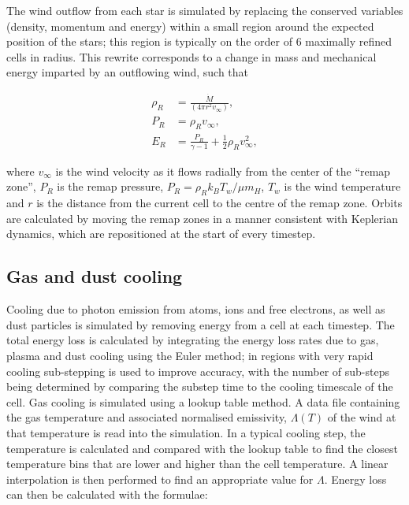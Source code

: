 The wind outflow from each star is simulated by replacing the conserved variables (density, momentum and energy) within a small region around the expected position of the stars; this region is typically on the order of 6 maximally refined cells in radius.
This rewrite corresponds to a change in mass and mechanical energy imparted by an outflowing wind, such that

\begin{subequations}
  \begin{align}
    \rho_R & = \frac{\dot M}{(4 \pi r^2 v_\infty)} , \\
    P_{R}  & = \rho_R v_\infty , \\
    E_R    & = \frac{P_R}{\gamma - 1} + \frac{1}{2} \rho_{R} v_\infty^2 ,
  \end{align}
\end{subequations}

\noindent
where $v_\infty$ is the wind velocity as it flows radially from the center of the ``remap zone'', $P_R$ is the remap pressure, $P_R = \rho_R k_B T_w / \mu m_H$, $T_w$ is the wind temperature and $r$ is the distance from the current cell to the centre of the remap zone.
Orbits are calculated by moving the remap zones in a manner consistent with Keplerian dynamics, which are repositioned at the start of every timestep.


\subsection{Gas and dust cooling} \label{sec:gas-dust-cooling}

Cooling due to photon emission from atoms, ions and free electrons, as well as dust particles is simulated by removing energy from a cell at each timestep.
The total energy loss is calculated by integrating the energy loss rates due to gas, plasma and dust cooling using the Euler method; in regions with very rapid cooling sub-stepping is used to improve accuracy, with the number of sub-steps being determined by comparing the substep time to the cooling timescale of the cell.
Gas cooling is simulated using a lookup table method.
A data file containing the gas temperature and associated normalised emissivity, $\Lambda(T)$ of the wind at that temperature is read into the simulation.
In a typical cooling step, the temperature is calculated and compared with the lookup table to find the closest temperature bins that are lower and higher than the cell temperature.
A linear interpolation is then performed to find an appropriate value for $\Lambda$.
Energy loss can then be calculated with the formulae:

